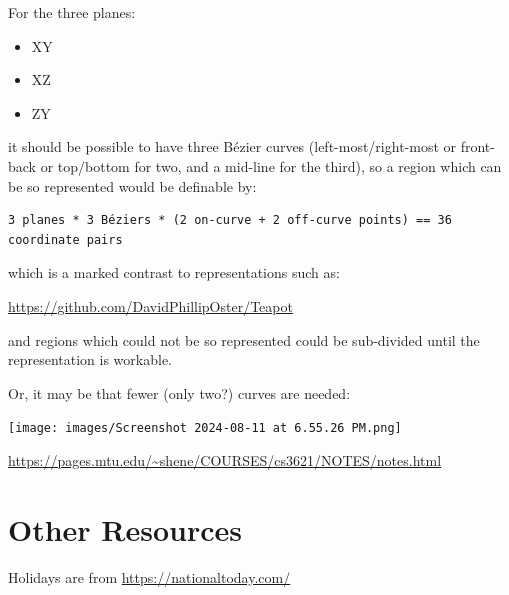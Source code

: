 \documentclass{ltxdoc}
\begin{document}
\begin{samepage}
For the three planes:

\begin{itemize}
 \item XY
 \item XZ
 \item ZY
\end{itemize}
 
\noindent it should be possible to have three Bézier curves (left-most/right-most or front-back or 
top/bottom for two, and a mid-line for the third), so a region which can be so represented would 
be definable by:
 
\begin{verbatim}
3 planes * 3 Béziers * (2 on-curve + 2 off-curve points) == 36 coordinate pairs
\end{verbatim}
\end{samepage}
 
\noindent which is a marked contrast to representations such as:
 
\url{https://github.com/DavidPhillipOster/Teapot}

\noindent and regions which could not be so represented could be sub-divided until the 
representation is workable.

Or, it may be that fewer (only two?) curves are needed:

\noindent\texttt{[image: images/Screenshot 2024-08-11 at 6.55.26 PM.png]}

\url{https://pages.mtu.edu/~shene/COURSES/cs3621/NOTES/notes.html}

\section{Other Resources}
 
Holidays are from \url{https://nationaltoday.com/}

 


\end{document}

